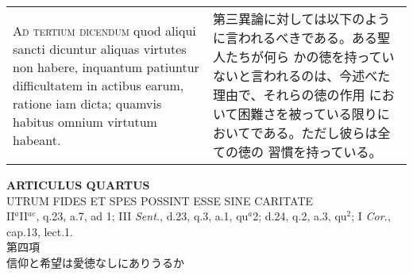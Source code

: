 \documentclass[10pt]{jsarticle}
\begin{document}
\begin{longtable}{p{21em}p{21em}}
\\

 {\scshape Ad tertium dicendum} quod aliqui sancti dicuntur aliquas
 virtutes non habere, inquantum patiuntur difficultatem in actibus
 earum, ratione iam dicta; quamvis habitus omnium virtutum habeant.
 
&

 第三異論に対しては以下のように言われるべきである。ある聖人たちが何ら
 かの徳を持っていないと言われるのは、今述べた理由で、それらの徳の作用
 において困難さを被っている限りにおいてである。ただし彼らは全ての徳の
 習慣を持っている。

\end{longtable}
\newpage


\begin{center}
{\Large {\bf ARTICULUS QUARTUS}}\\
{\large UTRUM FIDES ET SPES POSSINT ESSE SINE CARITATE}\\
{\footnotesize II$^{a}$II$^{ae}$, q.23, a.7, ad 1; III {\itshape Sent.}, d.23, q.3, a.1, qu$^{a}$2; d.24, q.2, a.3, qu$^{2}$; I {\itshape Cor.}, cap.13, lect.1.}\\
{\Large 第四項\\信仰と希望は愛徳なしにありうるか}
\end{center}
\end{document}
